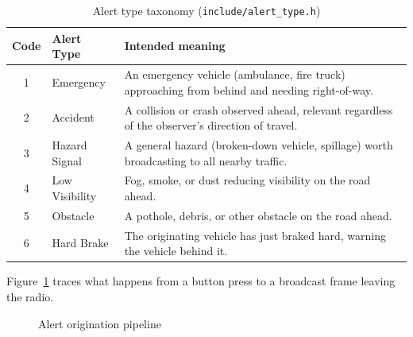 \documentclass[12pt,a4paper]{report}
\begin{document}
\begin{table}[H]
\centering
\caption{Alert type taxonomy (\texttt{include/alert\_type.h})}
\label{tab:alerttypes}
\begin{tabular}{@{}clp{7.6cm}@{}}
\toprule
\textbf{Code} & \textbf{Alert Type} & \textbf{Intended meaning} \\
\midrule
1 & Emergency & An emergency vehicle (ambulance, fire truck) approaching from behind and needing right-of-way. \\
2 & Accident & A collision or crash observed ahead, relevant regardless of the observer's direction of travel. \\
3 & Hazard Signal & A general hazard (broken-down vehicle, spillage) worth broadcasting to all nearby traffic. \\
4 & Low Visibility & Fog, smoke, or dust reducing visibility on the road ahead. \\
5 & Obstacle & A pothole, debris, or other obstacle on the road ahead. \\
6 & Hard Brake & The originating vehicle has just braked hard, warning the vehicle behind it. \\
\bottomrule
\end{tabular}
\end{table}

Figure~\ref{fig:origination} traces what happens from a button press to a broadcast frame leaving the radio.

\begin{figure}[H]
\centering
{}
\caption{Alert origination pipeline}
\label{fig:origination}
\end{figure}
\end{document}
